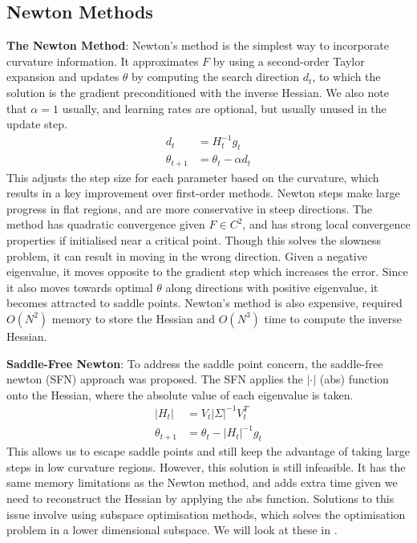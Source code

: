 \subsection{Newton Methods} \label{sec:newton_methods}
\textbf{The Newton Method}: Newton's method is the simplest way to incorporate curvature information. It approximates $F$ by using a second-order Taylor expansion and updates $\theta$ by computing the search direction $d_t$, to which the solution is the gradient preconditioned with the inverse Hessian. We also note that $\alpha = 1$ usually, and learning rates are optional, but usually unused in the update step.
\begin{align}
    d_t &= H_t^{-1} g_t \\
    \theta_{t+1} &= \theta_t - \alpha d_t
\end{align}
This adjusts the step size for each parameter based on the curvature, which results in a key improvement over first-order methods. Newton steps make large progress in flat regions, and are more conservative in steep directions. The method has quadratic convergence given $F \in C^{2}$, and has strong local convergence properties if initialised near a critical point. Though this solves the slowness problem, it can result in moving in the wrong direction. Given a negative eigenvalue, it moves opposite to the gradient step which increases the error. Since it also moves towards optimal $\theta$ along directions with positive eigenvalue, it becomes attracted to saddle points.
Newton's method is also expensive, required $O(N^2)$ memory to store the Hessian and $O(N^3)$ time to compute the inverse Hessian.

\textbf{Saddle-Free Newton}: To address the saddle point concern, the saddle-free newton (SFN) approach was proposed. The SFN applies the $|\cdot|$ (abs) function onto the Hessian, where the absolute value of each eigenvalue is taken.
\begin{align}
    |H_t| &= V_{t} |\Sigma|^{-1} V_{t}^T \\
    \theta_{t+1} &= \theta_t - |H_t|^{-1} g_t
\end{align}
This allows us to escape saddle points and still keep the advantage of taking large steps in low curvature regions. However, this solution is still infeasible. It has the same memory limitations as the Newton method, and adds extra time given we need to reconstruct the Hessian by applying the abs function. Solutions to this issue involve using subspace optimisation methods, which solves the optimisation problem in a lower dimensional subspace. We will look at these in .

